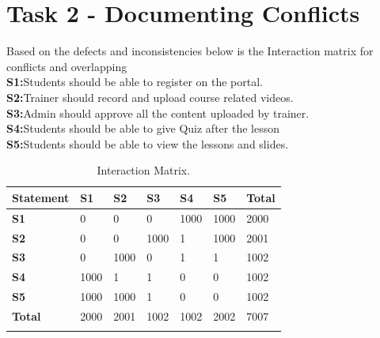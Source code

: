 \documentclass{report}
\begin{document}
\section{Task 2 - Documenting Conflicts}
Based on the defects and inconsistencies below is the Interaction matrix for conflicts and overlapping\\[0.3cm]
\textbf{S1:}Students should be able to register on the portal.\\
\textbf{S2:}Trainer should record and upload course related videos.\\
\textbf{S3:}Admin should approve all the content uploaded by trainer.\\
\textbf{S4:}Students should be able to give Quiz after the lesson\\
\textbf{S5:}Students should be able to view the lessons and slides.
\begin{longtable}{|p{2cm}|p{1.5cm}|p{1.5cm}|p{1.5cm}|p{1.5cm}|p{1.5cm}|p{1.5cm}|}
\hline
\textbf{Statement}&\textbf{S1}&\textbf{S2}&\textbf{S3}&\textbf{S4}&\textbf{S5}&\textbf{Total}\\ \hline
\textbf{S1}&0&0&0&1000&1000&2000\\ \hline
\textbf{S2}&0&0&1000&1&1000&2001\\ \hline
\textbf{S3}&0&1000&0&1&1&1002\\ \hline
\textbf{S4}&1000&1&1&0&0&1002\\ \hline
\textbf{S5}&1000&1000&1&0&0&1002\\ \hline
\textbf{Total}&2000&2001&1002&1002&2002&7007\\ \hline
\caption{Interaction Matrix.\label{long}}\\
\end{longtable}
\end{document}
